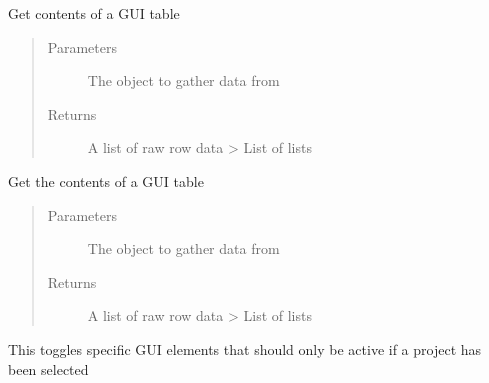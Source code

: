\documentclass[letterpaper,10pt,english]{sphinxmanual}
\begin{document}
\begin{fulllineitems}
\begin{fulllineitems}
\end{fulllineitems}


\begin{fulllineitems}
\label{\detokenize{src:src.Toolbox.Toolbox.tableExtractAllRowData}}
Get  contents of a GUI table
\begin{quote}\begin{description}
\item[{Parameters}] \leavevmode
{} \textendash{} The  object to gather data from

\item[{Returns}] \leavevmode
A list of raw row data \textendash{}\textgreater{} List of lists

\end{description}\end{quote}

\end{fulllineitems}


\begin{fulllineitems}
\label{\detokenize{src:src.Toolbox.Toolbox.tableExtractSelectedRowData}}
Get the  contents of a GUI table
\begin{quote}\begin{description}
\item[{Parameters}] \leavevmode
{} \textendash{} The  object to gather data from

\item[{Returns}] \leavevmode
A list of raw row data \textendash{}\textgreater{} List of lists

\end{description}\end{quote}

\end{fulllineitems}


\begin{fulllineitems}
\label{\detokenize{src:src.Toolbox.Toolbox.toggleDisabledProjectGUIElements}}
This toggles specific GUI elements that should only be active if a project has been selected


\end{fulllineitems}
\end{fulllineitems}
\end{document}
